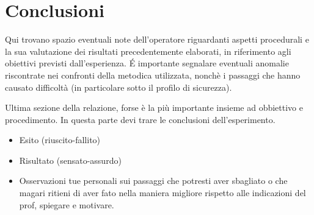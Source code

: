 \section{Conclusioni}
Qui trovano spazio eventuali note dell'operatore riguardanti aspetti procedurali e la sua valutazione dei risultati precedentemente elaborati, in riferimento agli obiettivi previsti dall'esperienza. \'E importante segnalare eventuali anomalie riscontrate nei confronti della metodica utilizzata, nonchè i passaggi che hanno causato difficoltà (in particolare sotto il profilo di sicurezza).

Ultima sezione della relazione, forse è la più importante insieme ad obbiettivo e procedimento. In questa parte devi trare le conclusioni dell'esperimento. 
\begin{itemize}
    \item Esito (riuscito-fallito)
    \item Risultato (sensato-assurdo)
    \item Osservazioni tue personali sui passaggi che potresti aver sbagliato o che magari ritieni di aver fato nella maniera migliore rispetto alle indicazioni del prof, spiegare e motivare.
\end{itemize}